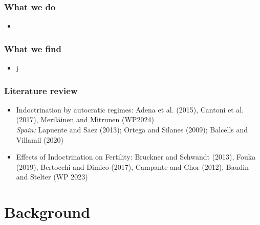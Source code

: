 \documentclass{beamer}
\begin{document}
\begin{frame}
\frametitle{What we do}
\centering
\begin{itemize}
 \item 
\end{itemize}
\end{frame}

\begin{frame}
\frametitle{What we find}
\begin{itemize}
	\item  j
\end{itemize}
 \end{frame}

\begin{frame}
\frametitle{Literature review}


\begin{itemize}
\item {\color{blue}Indoctrination by autocratic regimes}: Adena et al. (2015), Cantoni et al. (2017), Meriläinen and Mitrunen (WP2024)\\
\textit{Spain:} Lapuente and Saez (2013); Ortega and Silanes (2009); Balcells and Villamil (2020)
         
\item {\color{blue}Effects of Indoctrination on Fertility}: 	Bruckner and Schwandt (2013),	Fouka (2019), 	Bertocchi and Dimico (2017),	Campante and Chor (2012), Baudin and Stelter (WP 2023)


\end{itemize}

\end{frame}

\section{Background}
\end{document}
